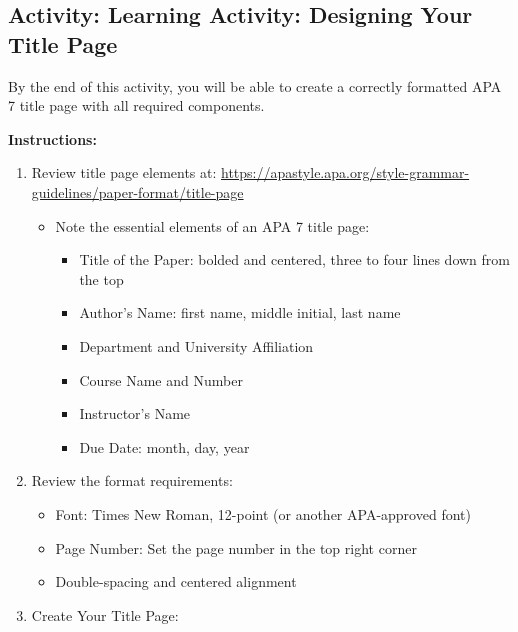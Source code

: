 \documentclass[
  letterpaper,
  DIV=11,
  numbers=noendperiod]{scrreprt}
\providecommand{\tightlist}{%
  \setlength{\itemsep}{0pt}\setlength{\parskip}{0pt}}\usepackage{longtable,booktabs,array}
\begin{document}
\subsection*{Activity: Learning Activity: Designing Your Title
Page}\label{activity-learning-activity-designing-your-title-page}

By the end of this activity, you will be able to create a correctly
formatted APA 7 title page with all required components.

\textbf{Instructions:}

\begin{enumerate}
\def\labelenumi{\arabic{enumi}.}
\tightlist
\item
  Review title page elements at:
  \url{https://apastyle.apa.org/style-grammar-guidelines/paper-format/title-page}

  \begin{itemize}
  \tightlist
  \item
    Note the essential elements of an APA 7 title page:

    \begin{itemize}
    \tightlist
    \item
      Title of the Paper: bolded and centered, three to four lines down
      from the top
    \item
      Author's Name: first name, middle initial, last name
    \item
      Department and University Affiliation
    \item
      Course Name and Number
    \item
      Instructor's Name
    \item
      Due Date: month, day, year
    \end{itemize}
  \end{itemize}
\item
  Review the format requirements:

  \begin{itemize}
  \tightlist
  \item
    Font: Times New Roman, 12-point (or another APA-approved font)
  \item
    Page Number: Set the page number in the top right corner
  \item
    Double-spacing and centered alignment
  \end{itemize}
\item
  Create Your Title Page:


\end{enumerate}
\end{document}
